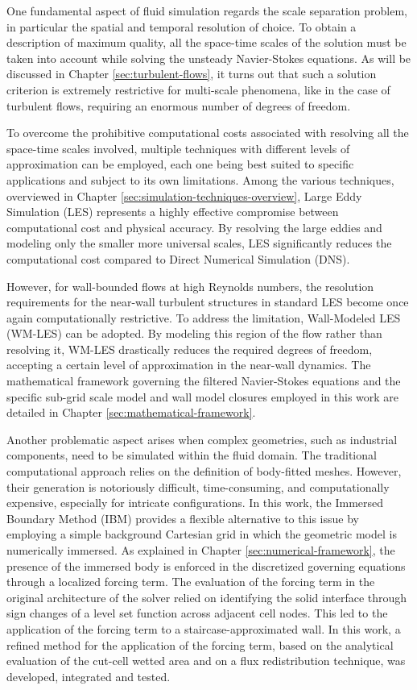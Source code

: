 \documentclass[12pt, a4paper, twoside, openright]{book}
\begin{document}
One fundamental aspect of fluid simulation regards the scale separation problem, in particular the spatial and temporal resolution of choice. To obtain a description of maximum quality, all the space-time scales of the solution must be taken into account while solving the unsteady Navier-Stokes equations. As will be discussed in Chapter \ref{sec:turbulent-flows}, it turns out that such a solution criterion is extremely restrictive for multi-scale phenomena, like in the case of turbulent flows, requiring an enormous number of degrees of freedom.

To overcome the prohibitive computational costs associated with resolving all the space-time scales involved, multiple techniques with different levels of approximation can be employed, each one being best suited to specific applications and subject to its own limitations. Among the various techniques, overviewed in Chapter \ref{sec:simulation-techniques-overview}, Large Eddy Simulation (LES) represents a highly effective compromise between computational cost and physical accuracy. By resolving the large eddies and modeling only the smaller more universal scales, LES significantly reduces the computational cost compared to Direct Numerical Simulation (DNS). 

However, for wall-bounded flows at high Reynolds numbers, the resolution requirements for the near-wall turbulent structures in standard LES become once again computationally restrictive. To address the limitation, Wall-Modeled LES (WM-LES) can be adopted. By modeling this region of the flow rather than resolving it, WM-LES drastically reduces the required degrees of freedom, accepting a certain level of approximation in the near-wall dynamics. The mathematical framework governing the filtered Navier-Stokes equations and the specific sub-grid scale model and wall model closures employed in this work are detailed in Chapter \ref{sec:mathematical-framework}.

Another problematic aspect arises when complex geometries, such as industrial components, need to be simulated within the fluid domain. The traditional computational approach relies on the definition of body-fitted meshes. However, their generation is notoriously difficult, time-consuming, and computationally expensive, especially for intricate configurations. In this work, the Immersed Boundary Method (IBM) provides a flexible alternative to this issue by employing a simple background Cartesian grid in which the geometric model is numerically immersed. As explained in Chapter \ref{sec:numerical-framework}, the presence of the immersed body is enforced in the discretized governing equations through a localized forcing term. The evaluation of the forcing term in the original architecture of the solver relied on identifying the solid interface through sign changes of a level set function across adjacent cell nodes. This led to the application of the forcing term to a staircase-approximated wall. In this work, a refined method for the application of the forcing term, based on the analytical evaluation of the cut-cell wetted area and on a flux redistribution technique, was developed, integrated and tested.
\end{document}
